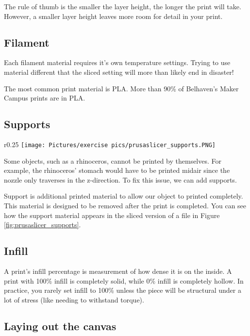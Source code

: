 \noindent The rule of thumb is the smaller the layer height, the longer the print will take. However, a smaller layer height leaves more room for detail in your print. 

\subsection{Filament}

Each filament material requires it's own temperature settings. Trying to use material different that the sliced setting will more than likely end in disaster!

\noindent The most common print material is PLA. More than 90\% of Belhaven's Maker Campus prints are in PLA.

\subsection{Supports}

\begin{wrapfigure}{r}{0.25\textwidth} %
    \centering
    \texttt{[image: Pictures/exercise pics/prusaslicer\_supports.PNG]}
    \label{fig:prusaslicer_supports}
\end{wrapfigure}

Some objects, such as a rhinoceros, cannot be printed by themselves. For example, the rhinoceros' stomach would have to be printed midair since the nozzle only traverses in the z-direction. To fix this issue, we can add supports.

\noindent Support is additional printed material to allow our object to printed completely. This material is designed to be removed after the print is completed. You can see how the support material appears in the sliced version of a file in Figure \ref{fig:prusaslicer_supports}.

\subsection{Infill}

A print's infill percentage is measurement of how dense it is on the inside. A print with 100\% infill is completely solid, while 0\% infill is completely hollow. In practice, you rarely set infill to 100\% unless the piece will be structural under a lot of stress (like needing to withstand torque).

\subsection{Laying out the canvas}

